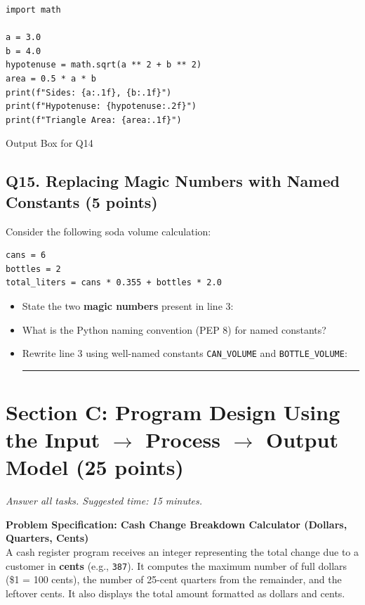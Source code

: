 \documentclass[11pt,a4paper]{article}
\begin{document}
\begin{lstlisting}
import math

a = 3.0
b = 4.0
hypotenuse = math.sqrt(a ** 2 + b ** 2)
area = 0.5 * a * b
print(f"Sides: {a:.1f}, {b:.1f}")
print(f"Hypotenuse: {hypotenuse:.2f}")
print(f"Triangle Area: {area:.1f}")
\end{lstlisting}

\begin{answerbox}[height=2.35cm]{Output Box for Q14}
\end{answerbox}

\subsection*{Q15. Replacing Magic Numbers with Named Constants (5 points)}
Consider the following soda volume calculation:

\begin{lstlisting}
cans = 6
bottles = 2
total_liters = cans * 0.355 + bottles * 2.0
\end{lstlisting}

\begin{itemize}[leftmargin=2em]
  \item State the two \textbf{magic numbers} present in line 3: \hrulefill
  \item What is the Python naming convention (PEP 8) for named constants? \hrulefill
  \item Rewrite line 3 using well-named constants \texttt{CAN\_VOLUME} and \texttt{BOTTLE\_VOLUME}:\\
  \rule{\linewidth}{0.4pt}
\end{itemize}

\newpage


\section*{Section C: Program Design Using the Input $\rightarrow$ Process $\rightarrow$ Output Model \hfill \normalsize\normalfont(25 points)}
\textit{Answer all tasks. Suggested time: 15 minutes.}

\begin{tcolorbox}[colback=boxbg,colframe=secondaryteal,arc=1.5mm,boxrule=0.6pt]
\textbf{Problem Specification: Cash Change Breakdown Calculator (Dollars, Quarters, Cents)}\\[1mm]
A cash register program receives an integer representing the total change due to a customer in \textbf{cents} (e.g., \texttt{387}). It computes the maximum number of full dollars (\$1 = 100 cents), the number of 25-cent quarters from the remainder, and the leftover cents. It also displays the total amount formatted as dollars and cents.
\end{tcolorbox}
\end{document}
